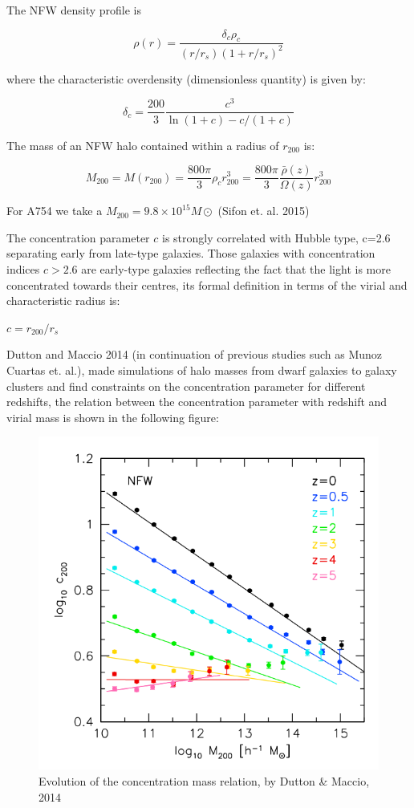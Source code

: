 The NFW density profile is 

\begin{equation}
\rho(r)=\frac{\delta_{c}\rho_{c}}{(r/r_{s})(1+r/r_{s})^{2}}
\end{equation}

where the characteristic overdensity (dimensionless quantity) is given by:

\begin{equation}
\delta_{c}=\frac{200}{3}\frac{c^{3}}{\ln{(1+c)}-c/(1+c)}
\end{equation}

The mass of an NFW halo contained within a radius of $r_{200}$ is:

\begin{equation}
M_{200}=M(r_{200})=\frac{800\pi}{3}\rho_{c}r^{3}_{200}=\frac{800\pi}{3}\frac{\bar{\rho}(z)}{\Omega(z)}r^{3}_{200}
\end{equation}

For A754 we take a $M_{200}=9.8\times 10^{15} M\odot$ (Sifon et. al. 2015)

The concentration parameter $c$ is strongly correlated with Hubble type, c=2.6 separating early from late-type galaxies. Those galaxies with concentration indices $c>2.6$ are early-type galaxies reflecting the fact that the light is more concentrated towards their centres, its formal definition in terms of the virial and characteristic radius is:

$c=r_{200}/r_{s}$

Dutton and Maccio 2014 (in continuation of previous studies such as Munoz Cuartas et. al.), made simulations of halo masses from dwarf galaxies to galaxy clusters and find constraints on the concentration parameter for different redshifts, the relation between the concentration parameter with redshift and virial mass is shown in the following figure:

\begin{figure}[H]
\centering
\includegraphics[width=12cm]{images/dutton.png}
\caption[Evolution of the concentration mass relation]{Evolution of the concentration mass relation, by Dutton \& Maccio, 2014}
\end{figure}

